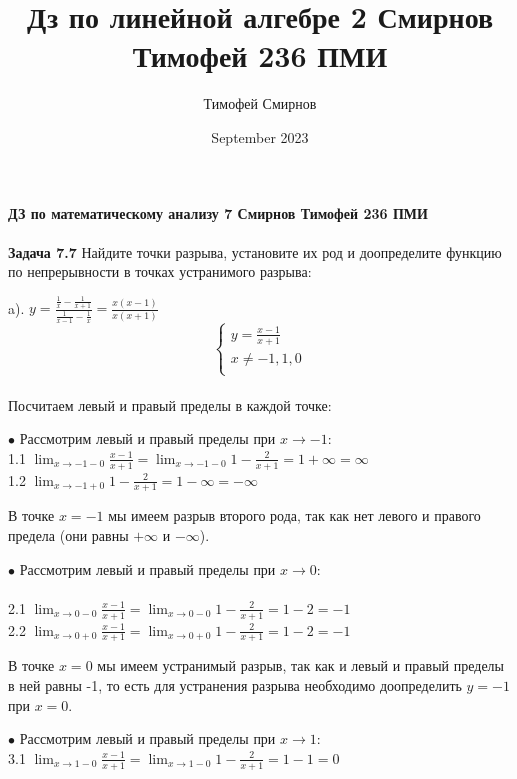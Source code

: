 \documentclass[a4paper, 12pt]{article}
\title{Дз по линейной алгебре 2 Смирнов Тимофей 236 ПМИ}
\author{Тимофей Смирнов}
\date{September 2023}
\begin{document}
    {\center \bf \large ДЗ по математическому анализу 7 Смирнов Тимофей 236 ПМИ}
    \\
    \\ \textbf{Задача 7.7} Найдите точки разрыва, установите их род и доопределите функцию по непрерывности в точках устранимого разрыва:
    \\
    \par a). $y = \frac{\frac{1}{x} - \frac{1}{x + 1}}{\frac{1}{x - 1} - \frac{1}{x}} = \frac{x(x - 1)}{x(x + 1)}$
    \begin{equation*}
        \begin{cases}
            y = \frac{x - 1}{x + 1} \\
            x \neq -1, 1, 0 \\
        \end{cases}
    \end{equation*}
    \\ Посчитаем левый и правый пределы в каждой точке:
    \\
    \par $\bullet$ Рассмотрим левый и правый пределы при $x \to -1$:
    \\ 1.1 $\lim_{x \to -1 - 0} \frac{x - 1}{x + 1} = \lim_{x \to -1 - 0} 1 - \frac{2}{x + 1} = 1 + \infty = \infty$
    \\ 1.2 $\lim_{x \to -1 + 0} 1 - \frac{2}{x + 1} = 1 - \infty = -\infty$
    \par В точке $x = -1$ мы имеем разрыв второго рода, так как нет левого и правого предела (они равны $+\infty$ и $-\infty$).
    \\
    \par $\bullet$ Рассмотрим левый и правый пределы при $x \to 0$:
    \\
    \\ 2.1 $\lim_{x \to 0 - 0} \frac{x - 1}{x + 1} = \lim_{x \to 0 - 0} 1 - \frac{2}{x + 1} = 1 - 2 = -1$
    \\ 2.2 $\lim_{x \to 0 + 0} \frac{x - 1}{x + 1} = \lim_{x \to 0 + 0} 1 - \frac{2}{x + 1} = 1 - 2 = -1$
    \par В точке $x = 0$ мы имеем устранимый разрыв, так как и левый и правый пределы в ней равны -1, то есть для устранения разрыва необходимо доопределить $y = -1$ при $x = 0$.
    \\
    \par $\bullet$ Рассмотрим левый и правый пределы при $x \to 1$:
    \\ 3.1 $\lim_{x \to 1 - 0} \frac{x - 1}{x + 1} = \lim_{x \to 1 - 0} 1 - \frac{2}{x + 1} = 1 - 1 = 0$
\end{document}
